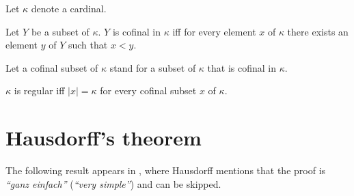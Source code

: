 \documentclass{article}
\begin{document}
  \begin{forthel}
    Let $\kappa$ denote a cardinal.

    \begin{definition*}[Cofinality]
      Let $Y$ be a subset of $\kappa$.
      $Y$ is cofinal in $\kappa$ iff for every element $x$ of $\kappa$ there
      exists an element $y$ of $Y$ such that $x < y$.
    \end{definition*}

    Let a cofinal subset of $\kappa$ stand for a subset of $\kappa$ that is
    cofinal in $\kappa$.

    \begin{definition*}
      $\kappa$ is regular iff $|x| = \kappa$ for every cofinal subset $x$ of
      $\kappa$.
    \end{definition*}
  \end{forthel}


  \section{Hausdorff's theorem}

  The following result appears in \cite[p.~443]{Hausdorff1908},
  where Hausdorff mentions that the proof is
  \textit{``ganz einfach''} (\textit{``very simple''}) and can be skipped.
\end{document}
